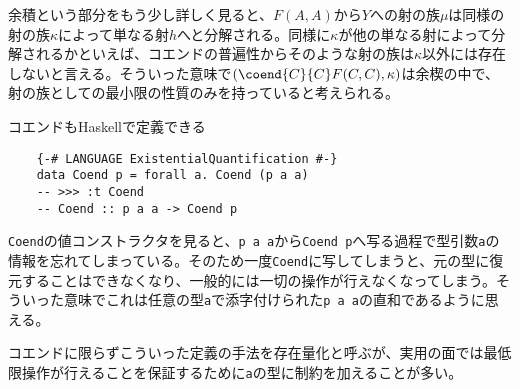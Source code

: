 \documentclass[uplatex,dvipdfmx]{jsarticle}
\newcommand{\pr}[1]{\colorbox[rgb]{0.9,0.9,0.9}{\lstinline{#1}}}
\begin{document}
  余積という部分をもう少し詳しく見ると、$F(A,A)$から$Y$への射の族$\mu$は同様の射の族$\kappa$によって単なる射$h$へと分解される。同様に$\kappa$が他の単なる射によって分解されるかといえば、コエンドの普遍性からそのような射の族は$\kappa$以外には存在しないと言える。そういった意味で$(\coend{C}{C} F(C,C),\kappa)$は余楔の中で、射の族としての最小限の性質のみを持っていると考えられる。

  コエンドもHaskellで定義できる
  \begin{lstlisting}
    {-# LANGUAGE ExistentialQuantification #-}
    data Coend p = forall a. Coend (p a a)
    -- >>> :t Coend
    -- Coend :: p a a -> Coend p
  \end{lstlisting}
  \pr{Coend}の値コンストラクタを見ると、\pr{p a a}から\pr{Coend p}へ写る過程で型引数\pr{a}の情報を忘れてしまっている。そのため一度\pr{Coend}に写してしまうと、元の型に復元することはできなくなり、一般的には一切の操作が行えなくなってしまう。そういった意味でこれは任意の型\pr{a}で添字付けられた\pr{p a a}の直和であるように思える。

  コエンドに限らずこういった定義の手法を存在量化と呼ぶが、実用の面では最低限操作が行えることを保証するために\pr{a}の型に制約を加えることが多い。
\end{document}
